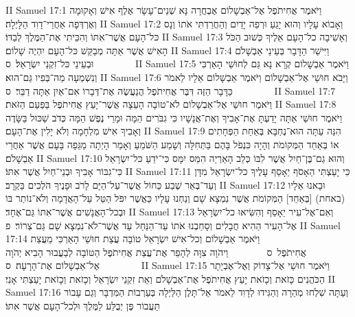II Samuel 17:1	וַיֹּאמֶר אֲחִיתֹפֶל אֶל־אַבְשָׁלוֹם אֶבְחֲרָה נָּא שְׁנֵים־עָשָׂר אֶלֶף אִישׁ וְאָקוּמָה וְאֶרְדְּפָה אַחֲרֵי־דָוִד הַלָּיְלָה׃
II Samuel 17:2	וְאָבוֹא עָלָיו וְהוּא יָגֵעַ וּרְפֵה יָדַיִם וְהַחֲרַדְתִּי אֹתוֹ וְנָס כּל־הָעָם אֲשֶׁר־אִתּוֹ וְהִכֵּיתִי אֶת־הַמֶּלֶךְ לְבַדּוֹ׃
II Samuel 17:3	וְאָשִׁיבָה כל־הָעָם אֵלֶיךָ כְּשׁוּב הַכֹּל הָאִישׁ אֲשֶׁר אַתָּה מְבַקֵּשׁ כּל־הָעָם יִהְיֶה שָׁלוֹם׃
II Samuel 17:4	וַיִּישַׁר הַדָּבָר בְּעֵינֵי אַבְשָׁלֹם וּבְעֵינֵי כּל־זִקְנֵי יִשְׂרָאֵל׃ {ס}        
II Samuel 17:5	וַיֹּאמֶר אַבְשָׁלוֹם קְרָא נָא גַּם לְחוּשַׁי הָאַרְכִּי וְנִשְׁמְעָה מַה־בְּפִיו גַּם־הוּא׃
II Samuel 17:6	וַיָּבֹא חוּשַׁי אֶל־אַבְשָׁלוֹם וַיֹּאמֶר אַבְשָׁלוֹם אֵלָיו לֵאמֹר כַּדָּבָר הַזֶּה דִּבֶּר אֲחִיתֹפֶל הֲנַעֲשֶׂה אֶת־דְּבָרוֹ אִם־אַיִן אַתָּה דַבֵּר׃ {ס}        
II Samuel 17:7	וַיֹּאמֶר חוּשַׁי אֶל־אַבְשָׁלוֹם לֹא־טוֹבָה הָעֵצָה אֲשֶׁר־יָעַץ אֲחִיתֹפֶל בַּפַּעַם הַזֹּאת׃
II Samuel 17:8	וַיֹּאמֶר חוּשַׁי אַתָּה יָדַעְתָּ אֶת־אָבִיךָ וְאֶת־אֲנָשָׁיו כִּי גִבֹּרִים הֵמָּה וּמָרֵי נֶפֶשׁ הֵמָּה כְּדֹב שַׁכּוּל בַּשָּׂדֶה וְאָבִיךָ אִישׁ מִלְחָמָה וְלֹא יָלִין אֶת־הָעָם׃
II Samuel 17:9	הִנֵּה עַתָּה הוּא־נֶחְבָּא בְּאַחַת הַפְּחָתִים אוֹ בְּאַחַד הַמְּקוֹמֹת וְהָיָה כִּנְפֹל בָּהֶם בַּתְּחִלָּה וְשָׁמַע הַשֹּׁמֵעַ וְאָמַר הָיְתָה מַגֵּפָה בָּעָם אֲשֶׁר אַחֲרֵי אַבְשָׁלֹם׃
II Samuel 17:10	וְהוּא גַם־בֶּן־חַיִל אֲשֶׁר לִבּוֹ כְּלֵב הָאַרְיֵה הִמֵּס יִמָּס כִּי־יֹדֵעַ כּל־יִשְׂרָאֵל כִּי־גִבּוֹר אָבִיךָ וּבְנֵי־חַיִל אֲשֶׁר אִתּוֹ׃
II Samuel 17:11	כִּי יָעַצְתִּי הֵאָסֹף יֵאָסֵף עָלֶיךָ כל־יִשְׂרָאֵל מִדָּן וְעַד־בְּאֵר שֶׁבַע כַּחוֹל אֲשֶׁר־עַל־הַיָּם לָרֹב וּפָנֶיךָ הֹלְכִים בַּקְרָב׃
II Samuel 17:12	וּבָאנוּ אֵלָיו (באחת) [בְּאַחַד] הַמְּקוֹמֹת אֲשֶׁר נִמְצָא שָׁם וְנַחְנוּ עָלָיו כַּאֲשֶׁר יִפֹּל הַטַּל עַל־הָאֲדָמָה וְלֹא־נוֹתַר בּוֹ וּבְכל־הָאֲנָשִׁים אֲשֶׁר־אִתּוֹ גַּם־אֶחָד׃
II Samuel 17:13	וְאִם־אֶל־עִיר יֵאָסֵף וְהִשִּׂיאוּ כל־יִשְׂרָאֵל אֶל־הָעִיר הַהִיא חֲבָלִים וְסָחַבְנוּ אֹתוֹ עַד־הַנַּחַל עַד אֲשֶׁר־לֹא־נִמְצָא שָׁם גַּם־צְרוֹר׃ {פ}
II Samuel 17:14	וַיֹּאמֶר אַבְשָׁלוֹם וְכל־אִישׁ יִשְׂרָאֵל טוֹבָה עֲצַת חוּשַׁי הָאַרְכִּי מֵעֲצַת אֲחִיתֹפֶל {ס}        וַיהֹוָה צִוָּה לְהָפֵר אֶת־עֲצַת אֲחִיתֹפֶל הַטּוֹבָה לְבַעֲבוּר הָבִיא יְהֹוָה אֶל־אַבְשָׁלוֹם אֶת־הָרָעָה׃ {ס}        
II Samuel 17:15	וַיֹּאמֶר חוּשַׁי אֶל־צָדוֹק וְאֶל־אֶבְיָתָר הַכֹּהֲנִים כָּזֹאת וְכָזֹאת יָעַץ אֲחִיתֹפֶל אֶת־אַבְשָׁלֹם וְאֵת זִקְנֵי יִשְׂרָאֵל וְכָזֹאת וְכָזֹאת יָעַצְתִּי אָנִי׃
II Samuel 17:16	וְעַתָּה שִׁלְחוּ מְהֵרָה וְהַגִּידוּ לְדָוִד לֵאמֹר אַל־תָּלֶן הַלַּיְלָה בְּעַרְבוֹת הַמִּדְבָּר וְגַם עָבוֹר תַּעֲבוֹר פֶּן יְבֻלַּע לַמֶּלֶךְ וּלְכל־הָעָם אֲשֶׁר אִתּוֹ׃
